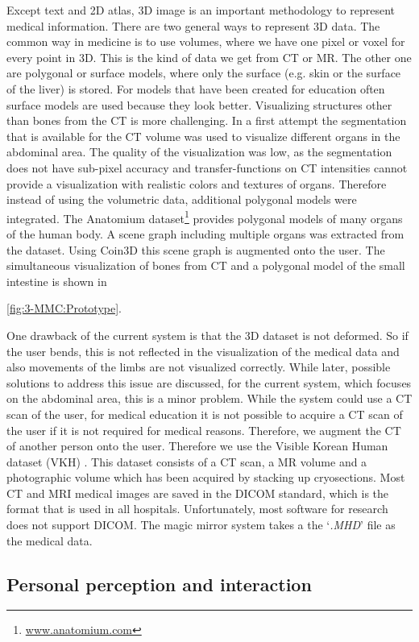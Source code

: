 {Except text and 2D atlas, 3D image is an important methodology to represent medical information. There are two general ways to represent 3D data. The common way in medicine is to use volumes, where we have one pixel or voxel for every point in 3D. This is the kind of data we get from CT or MR. The other one are polygonal or surface models, where only the surface (e.g. skin or the surface of the liver) is stored. For models that have been created for education often surface models are used because they look better.
Visualizing structures other than bones from the CT is more challenging. In a first attempt the segmentation that is available for the CT volume was used to visualize different organs in the abdominal area. The quality of the visualization was low, as the segmentation does not have sub-pixel accuracy and transfer-functions on CT intensities cannot provide a visualization with realistic colors and textures of organs. Therefore instead of using the volumetric data, additional polygonal models were integrated. The Anatomium dataset\footnote{\url{www.anatomium.com}} provides polygonal models of many organs of the human body. A scene graph including multiple organs was extracted from the dataset. Using Coin3D this scene graph is augmented onto the user. The simultaneous visualization of bones from CT and a polygonal model of the small intestine is shown in \figurename{\ref{fig:3-MMC:Prototype}.

One drawback of the current system is that the 3D dataset is not deformed. So if the user bends, this is not reflected in the visualization of the medical data and also movements of the limbs are not visualized correctly. While later, possible solutions to address this issue are discussed, for the current system, which focuses on the abdominal area, this is a minor problem.	
While the system could use a CT scan of the user, for medical education it is not possible to acquire a CT scan of the user if it is not required for medical reasons. Therefore, we augment the CT of another person onto the user. Therefore we use the Visible Korean Human dataset (VKH) \cite{Park2006}. This dataset consists of a CT scan, a MR volume and a photographic volume which has been acquired by stacking up cryosections. 
Most CT and MRI medical images are saved in the DICOM standard, which is the format that is used in all hospitals. Unfortunately, most software for research does not support DICOM. The magic mirror system takes a the `\textit{\*.MHD}' file as the medical data.

\subsection{Personal perception and interaction}
}}
